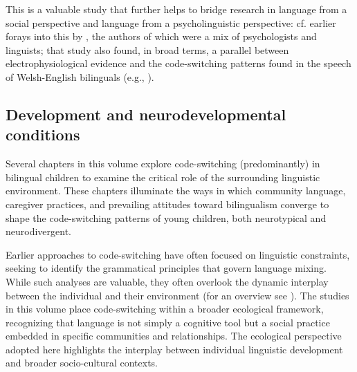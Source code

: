 \documentclass[output=paper]{langscibook}
\begin{document}
This is a valuable study that further helps to bridge research in language from a social perspective and language from a psycholinguistic perspective: cf. earlier forays into this by \citet{Vaughan-EvansEtAl2020}, the authors of which were a mix of psychologists and linguists; that study also found, in broad terms, a parallel between electrophysiological evidence and the code-switching patterns found in the speech of Welsh-English bilinguals (e.g., \citealt{DeucharEtAl2018}).

\subsection{Development and neurodevelopmental conditions}

Several chapters in this volume explore code-switching (predominantly) in bilingual children to examine the critical role of the surrounding linguistic environment. These chapters illuminate the ways in which community language, caregiver practices, and prevailing attitudes toward bilingualism converge to shape the code-switching patterns of young children, both neurotypical and neurodivergent.

Earlier approaches to code-switching have often focused on linguistic constraints, seeking to identify the grammatical principles that govern language mixing. While such analyses are valuable, they often overlook the dynamic interplay between the individual and their environment (for an overview see \citealt{Deuchar2020, ParafitaCoutoetal2023, PhillipsDeuchar2021}). The studies in this volume place code-switching within a broader ecological framework, recognizing that language is not simply a cognitive tool but a social practice embedded in specific communities and relationships. The ecological perspective adopted here highlights the interplay between individual linguistic development and broader socio-cultural contexts. 
\end{document}
